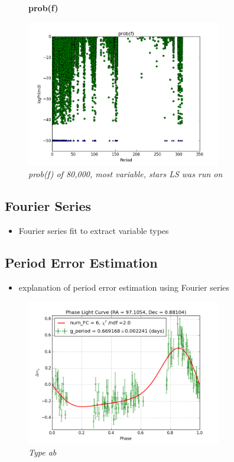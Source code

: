 \documentclass[aps,prl,twocolumn,superscriptaddress]{revtex4-1}
\begin{document}
\begin{figure}[H]
 \centering
 \textbf{prob(f)}\par\medskip
 	\includegraphics[width=3.35in]{figures/log_period_diff-50.png}
 \caption{\it \small{prob(f) of 80,000, most variable, stars LS was run on}}
 \label{fig:quartpy}
\end{figure}


\subsection{Fourier Series}

\begin{itemize}
	\item{} Fourier series fit to extract variable types
\end{itemize}

\subsection{Period Error Estimation}

\begin{itemize}
	\item{} explanation of period error estimation using Fourier series
\end{itemize}

\begin{figure}[H]
 \centering
 	\includegraphics[width=3.35in]{figures/FSP1_g_LC_rrrtest_p5_grp19.png}
 \caption{\it \small{Type ab}}
 \label{fig:quartiles}
\end{figure}
\end{document}
